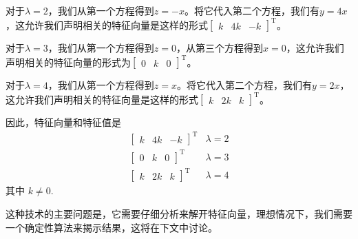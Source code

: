 对于$\lambda=2$，我们从第一个方程得到$z=-x$。将它代入第二个方程，我们有$y= 4x $，这允许我们声明相关的特征向量是这样的形式$\begin{bmatrix} k & 4 k & -k\end{bmatrix}^{\mathrm{T}}$。

对于$\lambda=3$，我们从第一个方程得到$z=0$，从第三个方程得到$x=0$，这允许我们声明相关的特征向量的形式为$\begin{bmatrix}0 & k & 0\end{bmatrix}^{\mathrm{T}}$。

对于$\lambda=4$，我们从第一个方程得到$z=x$。将它代入第二个方程，我们有$y=2 x$，这允许我们声明相关的特征向量是这样的形式$\begin{bmatrix}k & 2 k & k\end{bmatrix}^{\mathrm{T}}$。

因此，特征向量和特征值是
$$
\begin{array}{rrr}
{\left[\begin{array}{rrr}
k & 4 k & -k
\end{array}\right]^{\mathrm{T}}} & \lambda=2 \\
{\left[\begin{array}{lll}
0 & k & 0
\end{array}\right]^{\mathrm{T}}} & \lambda=3 \\
{\left[\begin{array}{lll}
k & 2 k & k
\end{array}\right]^{\mathrm{T}}} & \lambda=4
\end{array}
$$
其中 $k \neq 0$.

这种技术的主要问题是，它需要仔细分析来解开特征向量，理想情况下，我们需要一个确定性算法来揭示结果，这将在下文中讨论。

